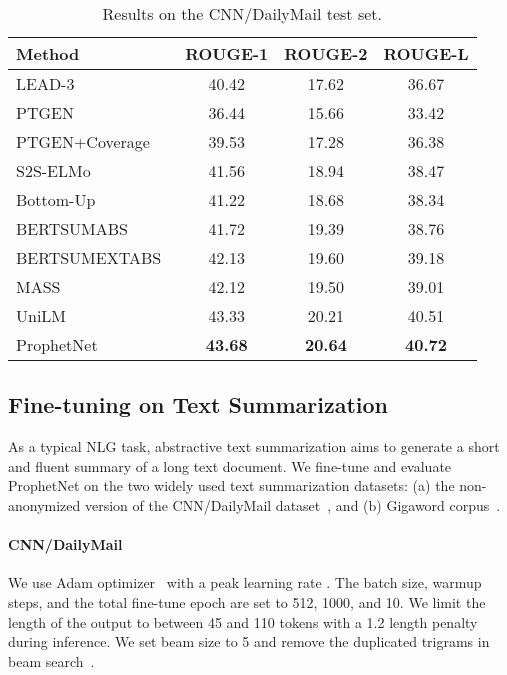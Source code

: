 \documentclass[11pt,a4paper]{article}
\begin{document}
\begin{table*}[th] 
\small
\begin{center}
  \begin{tabular}{lccc}
    \toprule
 Method & ROUGE-1 & ROUGE-2 & ROUGE-L \\
 \midrule
LEAD-3~\cite{nallapati2017summarunner} &40.42 &17.62 &36.67 \\
PTGEN~\cite{see2017get}  & 36.44 & 15.66 & 33.42\\
PTGEN+Coverage~\cite{see2017get}  &39.53 &17.28 &36.38\\
S2S-ELMo~\cite{edunov2019pre}  & 41.56 & 18.94 & 38.47\\
Bottom-Up~\cite{gehrmann2018bottom}  & 41.22 & 18.68 & 38.34\\
  BERTSUMABS~\cite{liu2019text} & 41.72 & 19.39 & 38.76\\
BERTSUMEXTABS~\cite{liu2019text} & 42.13 & 19.60 &39.18 \\ 
  MASS~\cite{song2019mass} & 42.12  &19.50&  39.01\\
 UniLM~\cite{dong2019unified} & 43.33  &20.21&   40.51\\
  \hline
  ProphetNet &\textbf{43.68} & \textbf{20.64} &  \textbf{40.72}\\
 \bottomrule
\end{tabular}
\end{center}
\caption{Results on the CNN/DailyMail test set.}
\label{tab:cnn} 
\end{table*}



\subsection{Fine-tuning on Text Summarization}\label{sec:exp2}
As a typical NLG task, abstractive text summarization aims to generate a short and fluent summary of a long text document.
We fine-tune and evaluate ProphetNet on the two widely used text summarization datasets: (a) the non-anonymized version of the CNN/DailyMail dataset~\cite{see2017get}, and (b) Gigaword corpus~\cite{rush2015neural}.

\paragraph{CNN/DailyMail} 
We use Adam optimizer~\cite{kingma2014adam} with a peak learning rate .
The batch size, warmup steps, and the total fine-tune epoch are set to 512, 1000, and 10. 
We limit the length of the output to between 45 and 110 tokens with a 1.2 length penalty during inference. 
We set beam size to 5 and remove the duplicated trigrams in beam search~\cite{fan2017controllable}. 
\end{document}
